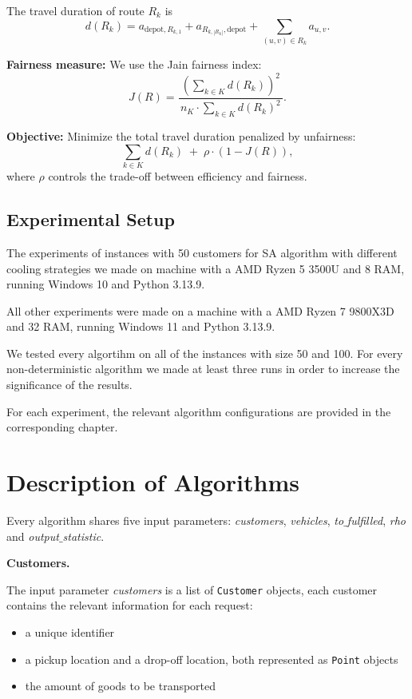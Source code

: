 \documentclass[12pt]{article}
\begin{document}
\begin{mdframed}[
    linecolor=black,
    linewidth=1.5pt,
    roundcorner=5pt,
    backgroundcolor=blue!5,
    userdefinedwidth=\textwidth,
]
The travel duration of route $R_k$ is
\[
d(R_k)
= a_{\text{depot}, R_{k,1}}
+ a_{R_{k,|R_k|}, \text{depot}}
+ \sum_{(u,v)\in R_k} a_{u,v}.
\]

\vspace{0.5em}
\textbf{Fairness measure:}  
We use the Jain fairness index:
\[
J(R)
=
\frac{\left(\sum_{k \in K} d(R_k)\right)^2}
{\,n_K \cdot \sum_{k \in K} d(R_k)^2\, }.
\]

\vspace{0.7em}
\textbf{Objective:}  
Minimize the total travel duration penalized by unfairness:
\[
\sum_{k \in K} d(R_k)
\;+\;
\rho \cdot (1 - J(R)),
\]
where $\rho$ controls the trade-off between efficiency and fairness.

\end{mdframed}

\subsection{Experimental Setup}

The experiments of instances with 50 customers for SA algorithm with different cooling strategies we made on machine with a AMD Ryzen 5 3500U and 8 RAM, running Windows 10 and Python 3.13.9. 

All other experiments were made on a machine with a AMD Ryzen 7 9800X3D and 32 RAM, running Windows 11 and Python 3.13.9.

We tested every algortihm on all of the instances with size 50 and 100. For every non-deterministic algorithm we made at least three runs in order to increase the significance of the results.

For each experiment, the relevant algorithm configurations are provided in the corresponding chapter.

\section{Description of Algorithms}

Every algorithm shares five input parameters: \emph{customers}, \emph{vehicles}, \emph{to$\_$fulfilled}, \emph{rho} and \emph{output$\_$statistic}. 

\vspace{0.6em}
\textbf{Customers.}

The input parameter \emph{customers} is a list of \texttt{Customer} objects, each customer contains the relevant information for each request:

\begin{itemize}
    \item a unique identifier
    \item a pickup location and a drop-off location, both represented as \texttt{Point} objects
    \item the amount of goods to be transported
\end{itemize}
\end{document}
